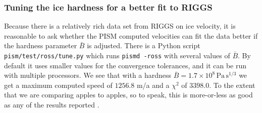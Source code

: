 \documentclass[11pt,final]{amsart}
\begin{document}
\subsubsection*{Tuning the ice hardness for a better fit to RIGGS}  Because there is a relatively rich data set from RIGGS on ice velocity, it is reasonable to ask whether the PISM computed velocities can fit the data better if the hardness parameter $\bar B$ is adjusted.  There is a Python script \verb|pism/test/ross/tune.py| which runs \verb|pismd -ross| with several values of $\bar B$.  By default it uses smaller values for the convergence tolerances, and it can be run with multiple processors.  We see that with a hardness $\bar B = 1.7 \times 10^8 \, \text{Pa}\, \text{s}^{1/3}$ we get a maximum computed speed of $1256.8$ m/a and a $\chi^2$ of $3398.0$.  To the extent that we are comparing apples to apples, so to speak, this is more-or-less as good as any of the results reported \cite{MacAyealetal}.
\end{document}
